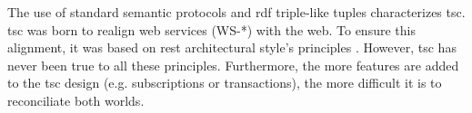 The use of standard semantic protocols and \ac{rdf} triple-like tuples characterizes \acl{tsc}. %
\ac{tsc} was born to realign web services (WS-*) with the web.
To ensure this alignment, it was based on \ac{rest} architectural style's principles \citep{fensel_triple-space_2004,hernandez_formal_2010}. %
However, \ac{tsc} has never been true to all these principles. %
Furthermore, the more features are added to the \ac{tsc} design (e.g. subscriptions or transactions), the more difficult it is to reconciliate both worlds.

%


